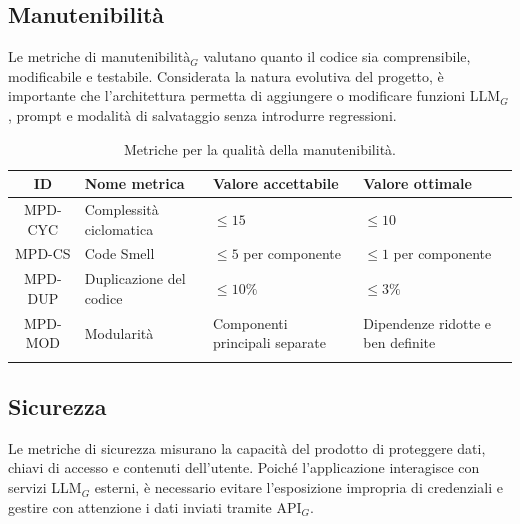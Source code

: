 \documentclass[a4paper, 10pt, colorlinks=true, linkcolor=black, urlcolor=blue, citecolor=blue, hidelinks]{article}
\begin{document}
\subsection{Manutenibilità}

Le metriche di manutenibilità$_G$ valutano quanto il codice sia comprensibile, modificabile e testabile. Considerata la natura evolutiva del progetto, è importante che l'architettura permetta di aggiungere o modificare funzioni LLM$_G$, prompt e modalità di salvataggio senza introdurre regressioni.

\begingroup
\small
\renewcommand{\arraystretch}{1.25}
\begin{longtable}{|c|p{4cm}|p{3cm}|p{3cm}|}
    \hline
    \textbf{ID} & \textbf{Nome metrica} & \textbf{Valore accettabile} & \textbf{Valore ottimale} \\
    \hline
    \endhead

    MPD-CYC & Complessità ciclomatica & $\leq 15$ & $\leq 10$ \\ \hline
    MPD-CS & Code Smell & $\leq 5$ per componente & $\leq 1$ per componente \\ \hline
    MPD-DUP & Duplicazione del codice & $\leq 10\%$ & $\leq 3\%$ \\ \hline
    MPD-MOD & Modularità & Componenti principali separate & Dipendenze ridotte e ben definite \\ \hline

    \caption{Metriche per la qualità della manutenibilità.}
    \label{tab:metriche-manutenibilita}
\end{longtable}
\endgroup

\subsection{Sicurezza}

Le metriche di sicurezza misurano la capacità del prodotto di proteggere dati, chiavi di accesso e contenuti dell'utente. Poiché l'applicazione interagisce con servizi LLM$_G$ esterni, è necessario evitare l'esposizione impropria di credenziali e gestire con attenzione i dati inviati tramite API$_G$.
\end{document}

